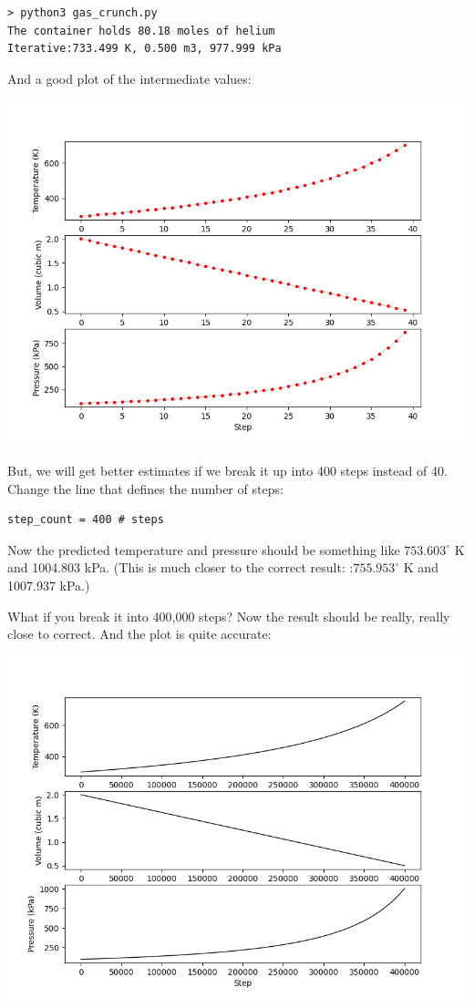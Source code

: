 \begin{Verbatim}
> python3 gas_crunch.py            
The container holds 80.18 moles of helium
Iterative:733.499 K, 0.500 m3, 977.999 kPa
\end{Verbatim}

And a good plot of the intermediate values:

\includegraphics[width=\textwidth]{chunkplot1.png}

But, we will get better estimates if we break it up into 400 steps instead of 40.    Change the line that defines the number of steps:

\begin{Verbatim}
step_count = 400 # steps
\end{Verbatim}

Now the predicted temperature and pressure should be something like $753.603^\circ$  K and 1004.803 kPa.   (This is much closer to the correct result: :$755.953^\circ$ K and 1007.937 kPa.)

What if you break it into 400,000 steps?  Now the result should be really, really close to correct.  And the plot is quite accurate:

\includegraphics[width=\textwidth]{chunkplot2.png}

